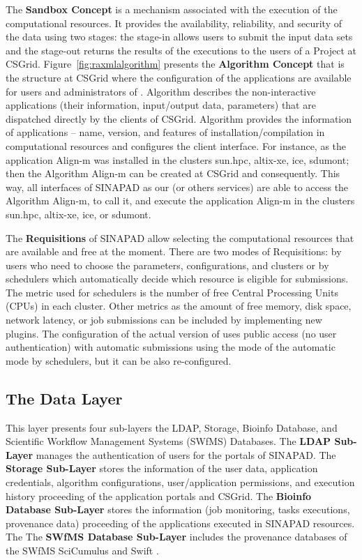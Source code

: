 The \textbf{Sandbox Concept} is a mechanism associated with the execution of the computational resources. It provides the availability, reliability, and security of the data using two stages: the stage-in allows users to submit the input data sets and the stage-out returns the results of the executions to the users of a Project at CSGrid. Figure~\ref{fig:raxmlalgorithm} presents the \textbf{Algorithm Concept} that is the structure at CSGrid where the configuration of the applications are available for users and administrators of \system. Algorithm describes the non-interactive applications (their information, input/output data, parameters) that are dispatched directly by the clients of CSGrid. Algorithm provides the information of applications – name, version, and features of installation/compilation in computational resources and configures the client interface. For instance, as the application Align-m was installed in the clusters sun.hpc, altix-xe, ice, sdumont; then the Algorithm Align-m can be created at CSGrid and consequently. This way, all interfaces of SINAPAD as our \system (or others services) are able to access the Algorithm Align-m, to call it, and execute the application Align-m in the clusters sun.hpc, altix-xe, ice, or sdumont.

The \textbf{Requisitions} of SINAPAD allow selecting the computational resources that are available and free at the moment. There are two modes of Requisitions: by users who need to choose the parameters, configurations, and clusters or by schedulers which automatically decide which resource is eligible for submissions. The metric used for schedulers is the number of free Central Processing Units (CPUs) in each cluster. Other metrics as the amount of free memory, disk space, network latency, or job submissions can be included by implementing new plugins. The configuration of the actual version of \system uses public access (no user authentication) with automatic submissions using the mode of the automatic mode by schedulers, but it can be also re-configured.

\vspace{-5px}
\subsection{The Data Layer}

This layer presents four sub-layers the LDAP, Storage, Bioinfo Database, and Scientific Workflow Management Systems (SWfMS) Databases. The \textbf{LDAP Sub-Layer} manages the authentication of users for the portals of SINAPAD. The \textbf{Storage Sub-Layer} stores the information of the user data, application credentials, algorithm configurations, user/application permissions, and execution history proceeding of the application portals and CSGrid. The \textbf{Bioinfo Database Sub-Layer} stores the information (job monitoring, tasks executions, provenance data) proceeding of the applications executed in SINAPAD resources. The The \textbf{SWfMS Database Sub-Layer} includes the provenance databases of the SWfMS SciCumulus \cite{5557969} and Swift \cite{article}. 

